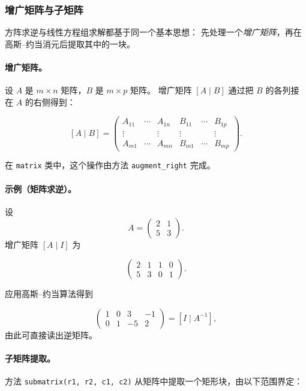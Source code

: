 \subsubsection{增广矩阵与子矩阵}
\label{ssub:matrix-augmentation-submatrix}

方阵求逆与线性方程组求解都基于同一个基本思想：
先处理一个\emph{增广矩阵}，再在高斯–约当消元后提取其中的一块。

\medskip

\paragraph{增广矩阵。}
设 $A$ 是 $m\times n$ 矩阵，$B$ 是 $m\times p$ 矩阵。
增广矩阵 $[A \mid B]$ 通过把 $B$ 的各列接在 $A$ 的右侧得到：

\[
[A \mid B] =
\begin{pmatrix}
A_{11} & \cdots & A_{1n} & B_{11} & \cdots & B_{1p} \\
\vdots &        & \vdots & \vdots &        & \vdots \\
A_{m1} & \cdots & A_{mn} & B_{m1} & \cdots & B_{mp}
\end{pmatrix}.
\]

在 \texttt{matrix} 类中，这个操作由方法 \texttt{augment\_right} 完成。

\medskip

\paragraph{示例（矩阵求逆）。}
设
\[
A =
\begin{pmatrix}
2 & 1\\
5 & 3
\end{pmatrix}.
\]
增广矩阵 $[A \mid I]$ 为

\[
\begin{pmatrix}
2 & 1 & 1 & 0\\
5 & 3 & 0 & 1
\end{pmatrix}.
\]

应用高斯–约当算法得到

\[
\begin{pmatrix}
1 & 0 & 3 & -1\\
0 & 1 & -5 & 2
\end{pmatrix}
=
[I \mid A^{-1}],
\]
由此可直接读出逆矩阵。

\medskip

\paragraph{子矩阵提取。}
方法 \texttt{submatrix(r1, r2, c1, c2)} 从矩阵中提取一个矩形块，由以下范围界定：

